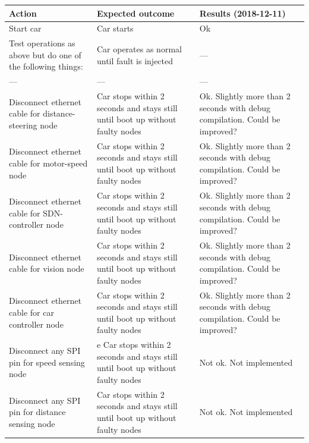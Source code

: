 \documentclass[11pt, titlepage]{article} %
\begin{document}
\begin{table}[H]
 \label{tab:title}
\centering
\begin{tabular}{|m{5cm}|m{5cm}|m{5cm}|}
\hline
Action & Expected outcome & Results (2018-12-11) \\ \hline
Start car  & Car starts      & Ok  \\ \hline
Test operations as above but do one of the following things:  &  Car operates as normal until fault is injected     & ---  \\ \hline
---  &  ---     & ---  \\ \hline
Disconnect ethernet cable for distance-steering node  & Car stops within 2 seconds and stays still until boot up without faulty nodes      & Ok. Slightly more than 2 seconds with debug compilation. Could be improved?  \\ \hline
Disconnect ethernet cable for motor-speed node  &  Car stops within 2 seconds and stays still until boot up without faulty nodes     & Ok. Slightly more than 2 seconds with debug compilation. Could be improved?  \\ \hline
Disconnect ethernet cable for SDN-controller node  & 	Car stops within 2 seconds and stays still until boot up without faulty nodes      & Ok. Slightly more than 2 seconds with debug compilation. Could be improved?  \\ \hline
Disconnect ethernet cable for vision node  &  	Car stops within 2 seconds and stays still until boot up without faulty nodes     & Ok. Slightly more than 2 seconds with debug compilation. Could be improved?  \\ \hline
Disconnect ethernet cable for car controller node  &  Car stops within 2 seconds and stays still until boot up without faulty nodes     & Ok. Slightly more than 2 seconds with debug compilation. Could be improved?  \\ \hline
Disconnect any SPI pin for speed sensing node  &  e	Car stops within 2 seconds and stays still until boot up without faulty nodes     & Not ok. Not implemented \\ \hline
Disconnect any SPI pin for distance sensing node  & Car stops within 2 seconds and stays still until boot up without faulty nodes      & Not ok. Not implemented  \\ \hline

\end{tabular}
\end{table} 
  
\clearpage
\end{document}
